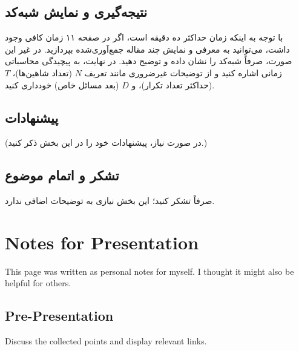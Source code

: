 \documentclass[12pt]{article}
\begin{document}
\subsection*{نتیجه‌گیری و نمایش شبه‌کد}
با توجه به اینکه زمان حداکثر ده دقیقه است، اگر در صفحه ۱۱ زمان کافی وجود داشت، می‌توانید به معرفی و نمایش چند مقاله جمع‌آوری‌شده بپردازید.  
در غیر این صورت، صرفاً شبه‌کد را نشان داده و توضیح دهید.  
در نهایت، به پیچیدگی محاسباتی زمانی اشاره کنید و از توضیحات غیرضروری مانند تعریف \( N \) (تعداد شاهین‌ها)، \( T \) (حداکثر تعداد تکرار)، و \( D \) (بعد مسائل خاص) خودداری کنید.

\subsection*{پیشنهادات}
(در صورت نیاز، پیشنهادات خود را در این بخش ذکر کنید.)

\subsection*{تشکر و اتمام موضوع}
صرفاً تشکر کنید؛ این بخش نیازی به توضیحات اضافی ندارد.

\newpage 
\LTR

\section*{Notes for Presentation}
This page was written as personal notes for myself. I thought it might also be helpful for others.

\subsection*{Pre-Presentation}
Discuss the collected points and display relevant links.
\end{document}
